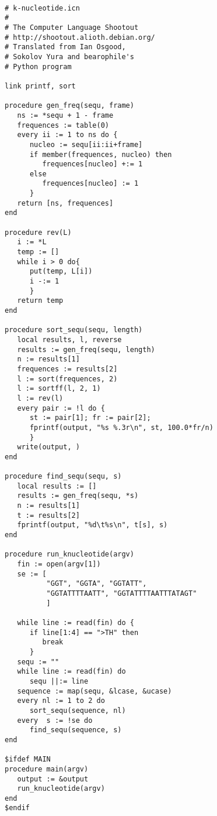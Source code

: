 \documentclass[letterpaper,12pt]{article}
\begin{document}
\begin{verbatim}

# k-nucleotide.icn
#
# The Computer Language Shootout
# http://shootout.alioth.debian.org/
# Translated from Ian Osgood, 
# Sokolov Yura and bearophile's
# Python program

link printf, sort

procedure gen_freq(sequ, frame)
   ns := *sequ + 1 - frame
   frequences := table(0)
   every ii := 1 to ns do {
      nucleo := sequ[ii:ii+frame]
      if member(frequences, nucleo) then
         frequences[nucleo] +:= 1
      else
         frequences[nucleo] := 1
      }
   return [ns, frequences]
end

procedure rev(L)
   i := *L
   temp := []
   while i > 0 do{
      put(temp, L[i])
      i -:= 1
      }
   return temp
end

procedure sort_sequ(sequ, length)
   local results, l, reverse
   results := gen_freq(sequ, length)
   n := results[1]
   frequences := results[2]
   l := sort(frequences, 2)  
   l := sortff(l, 2, 1)
   l := rev(l)
   every pair := !l do {
      st := pair[1]; fr := pair[2];
      fprintf(output, "%s %.3r\n", st, 100.0*fr/n)
      }
   write(output, )
end

procedure find_sequ(sequ, s)
   local results := []
   results := gen_freq(sequ, *s)
   n := results[1]
   t := results[2]
   fprintf(output, "%d\t%s\n", t[s], s)
end

procedure run_knucleotide(argv)
   fin := open(argv[1])
   se := [
          "GGT", "GGTA", "GGTATT", 
          "GGTATTTTAATT", "GGTATTTTAATTTATAGT"
          ]

   while line := read(fin) do {
      if line[1:4] == ">TH" then
         break
      }      
   sequ := ""
   while line := read(fin) do
      sequ ||:= line 
   sequence := map(sequ, &lcase, &ucase)
   every nl := 1 to 2 do
      sort_sequ(sequence, nl)
   every  s := !se do
      find_sequ(sequence, s)
end

$ifdef MAIN
procedure main(argv)
   output := &output
   run_knucleotide(argv)
end
$endif

\end{verbatim}

\newpage
\end{document}
